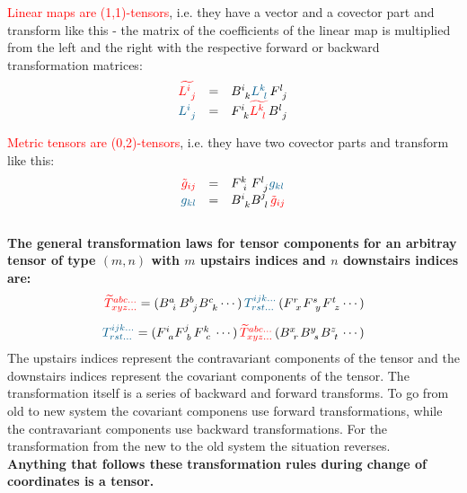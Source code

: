 \textcolor{red}{Linear maps are (1,1)-tensors}, i.e. they have a vector and a covector
part and transform like this - the matrix of the coefficients of the linear map is
multiplied from the left and the right with the respective forward or backward
transformation matrices:
\begin{equation}
    \begin{array}{rcl}
        \textcolor{red}{\widetilde{L^{i~}_{~j}}} & = &
        B^{i~}_{~k} \textcolor{MidnightBlue}{L^{k~}_{~l}} F^{l~}_{~j} \\
        \textcolor{MidnightBlue}{L^{i~}_{~j}} & = &
        F^{i~}_{~k} \textcolor{red}{\widetilde{L^{k~}_{~l}}} B^{l~}_{~j}
    \end{array}
\end{equation}

\textcolor{red}{Metric tensors are (0,2)-tensors}, i.e. they have two covector parts and
transform like this:
\begin{equation}
    \begin{array}{rcl}
        \textcolor{red}{\tilde{g}_{ij}} & = &
        F^{k~}_{~i}  F^{l~}_{~j} \textcolor{MidnightBlue}{{g}_{kl}} \\
        \textcolor{MidnightBlue}{g_{kl}} & = &
        B^{i~}_{~k} B^{j~}_{~l} \textcolor{red}{\tilde{g}_{ij}}
    \end{array}
\end{equation} \\

\textbf{The general transformation laws for tensor components for an arbitray tensor of type
$(m,n)$ with $m$ upstairs indices and $n$ downstairs indices are:}
\begin{equation}
    \begin{array}{rcl}
        \textcolor{red}{\widetilde{T}^{abc...}_{xyz...}} =
            (B^{a~}_{~i} B^{b~}_{~j} B^{c~}_{~k} \cdots)
            \,\textcolor{MidnightBlue}{T^{ijk...}_{rst...}}\,
            (F^{r~}_{~x} F^{s~}_{~y} F^{t~}_{~z} \cdots) \\
        \noalign{\vskip10pt}
        \textcolor{MidnightBlue}{T^{ijk...}_{rst...}} =
            (F^{i~}_{~a} F^{j~}_{~b} F^{k~}_{~c} \cdots)
            \,\textcolor{red}{\widetilde{T}^{abc...}_{xyz...}}\,
            (B^{x~}_{~r} B^{y~}_{~s} B^{z~}_{~t} \cdots)
    \end{array}
\end{equation}
The upstairs indices represent the contravariant components of the tensor and the
downstairs indices represent the covariant components of the tensor. The transformation
itself is a series of backward and forward transforms. To go from old to new system the
covariant componens use forward transformations, while the contravariant components use
backward transformations. For the transformation from the new to the old system the
situation reverses. \\

\textbf{Anything that follows these transformation rules during change of coordinates
is a tensor.}


\newpage